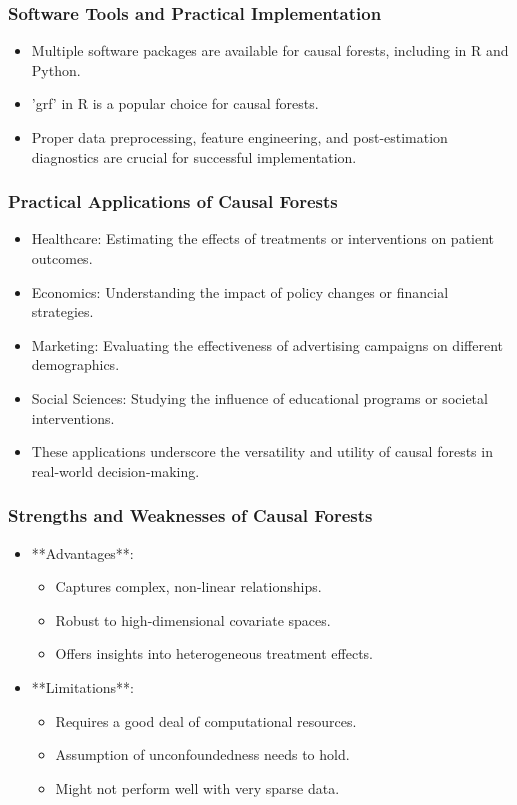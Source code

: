 \documentclass{beamer}
\begin{document}
\begin{frame}
\frametitle{Software Tools and Practical Implementation}
\begin{itemize}
    \item Multiple software packages are available for causal forests, including in R and Python.
    \item 'grf' in R is a popular choice for causal forests.
    \item Proper data preprocessing, feature engineering, and post-estimation diagnostics are crucial for successful implementation.
\end{itemize}
\end{frame}




\begin{frame}
\frametitle{Practical Applications of Causal Forests}
\begin{itemize}
    \item Healthcare: Estimating the effects of treatments or interventions on patient outcomes.
    \item Economics: Understanding the impact of policy changes or financial strategies.
    \item Marketing: Evaluating the effectiveness of advertising campaigns on different demographics.
    \item Social Sciences: Studying the influence of educational programs or societal interventions.
    \item These applications underscore the versatility and utility of causal forests in real-world decision-making.
\end{itemize}
\end{frame}


\begin{frame}
\frametitle{Strengths and Weaknesses of Causal Forests}
\begin{itemize}
    \item **Advantages**:
        \begin{itemize}
            \item Captures complex, non-linear relationships.
            \item Robust to high-dimensional covariate spaces.
            \item Offers insights into heterogeneous treatment effects.
        \end{itemize}
    \item **Limitations**:
        \begin{itemize}
            \item Requires a good deal of computational resources.
            \item Assumption of unconfoundedness needs to hold.
            \item Might not perform well with very sparse data.
        \end{itemize}
\end{itemize}
\end{frame}
\end{document}
